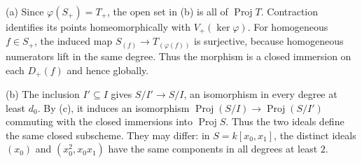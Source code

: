 (a) Since $\varphi(S_+)=T_+$, the open set in (b) is all of $\operatorname{Proj}T$. Contraction identifies its points homeomorphically with $V_+(\ker\varphi)$. For homogeneous $f\in S_+$, the induced map $S_{(f)}\to T_{(\varphi(f))}$ is surjective, because homogeneous numerators lift in the same degree. Thus the morphism is a closed immersion on each $D_+(f)$ and hence globally.

(b) The inclusion $I'\subseteq I$ gives $S/I'\to S/I$, an isomorphism in every degree at least $d_0$. By (c), it induces an isomorphism $\operatorname{Proj}(S/I)\to\operatorname{Proj}(S/I')$ commuting with the closed immersions into $\operatorname{Proj}S$. Thus the two ideals define the same closed subscheme. They may differ: in $S=k[x_0,x_1]$, the distinct ideals $(x_0)$ and $(x_0^2,x_0x_1)$ have the same components in all degrees at least $2$.
